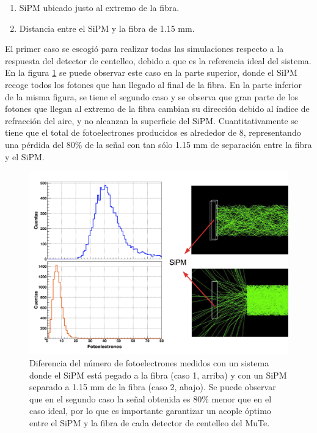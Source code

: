 \documentclass[12pt,oneside,openany,letter]{book}
\begin{document}
\begin{enumerate}
\item SiPM ubicado justo al extremo de la fibra.
\item Distancia entre el SiPM y la fibra de 1.15 mm.
\end{enumerate}

El primer caso se escogió para realizar todas las simulaciones respecto a la respuesta del detector de centelleo, debido a que es la referencia ideal del sistema. En la figura \ref{perdida} se puede observar este caso en la parte superior, donde el SiPM recoge todos los fotones que han llegado al final de la fibra. En la parte inferior de la misma figura, se tiene el segundo caso y se observa que gran parte de los fotones que llegan al extremo de la fibra cambian su dirección debido al índice de refracción del aire, y no alcanzan la superficie del SiPM. Cuantitativamente se tiene que el total de fotoelectrones producidos es alrededor de 8, representando una pérdida del 80\% de la señal con tan sólo 1.15 mm de separación entre la fibra y el SiPM. 
\begin{figure}[h!]
    \centering
        \includegraphics[scale=0.5]{images/perdida.png}
   \caption[Diferencia del número de fotoelectrones medidos con dos sistemas de acople entre el SiPM y la fibra]{Diferencia del número de fotoelectrones medidos con un sistema donde el SiPM está pegado a la fibra (caso 1, arriba) y con un SiPM separado a 1.15 mm de la fibra (caso 2, abajo). Se puede observar que en el segundo caso la señal obtenida es 80\% menor que en el caso ideal, por lo que es importante garantizar un acople \'optimo entre el SiPM y la fibra de cada detector de centelleo del MuTe.}\label{perdida}
\end{figure}
\end{document}
